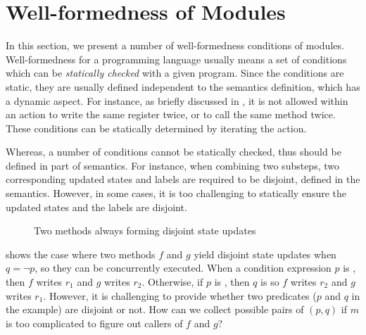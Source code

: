 \section{Well-formedness of Modules}
\label{sec-wf}

In this section, we present a number of well-formedness conditions of
modules. Well-formedness for a programming language usually means a
set of conditions which can be \emph{statically checked} with a given
program. Since the conditions are static, they are usually defined
independent to the semantics definition, which has a dynamic aspect.
For instance, as briefly discussed in , it is not
allowed within an action to write the same register twice, or to call
the same method twice. These conditions can be statically determined
by iterating the action.

Whereas, a number of conditions cannot be statically checked, thus
should be defined in part of semantics. For instance, when combining
two substeps, two corresponding updated states and labels are required
to be disjoint, defined in the \Substeps{} semantics. However, in some
cases, it is too challenging to statically ensure the updated states
and the labels are disjoint.

\begin{figure}[h]
  \caption{Two methods always forming disjoint state updates}
  \label{ex-two-methods-disjoint}
\end{figure}

 shows the case where two methods $f$
and $g$ yield disjoint state updates when $q = \neg p$, so they can be
concurrently executed. When a condition expression $p$ is \btrue{},
then $f$ writes $r_1$ and $g$ writes $r_2$. Otherwise, if $p$ is
\bfalse{}, then $q$ is \btrue{} so $f$ writes $r_2$ and $g$ writes
$r_1$. However, it is challenging to provide whether two predicates
($p$ and $q$ in the example) are disjoint or not. How can we collect
possible pairs of $(p, q)$ if $m$ is too complicated to figure out
callers of $f$ and $g$?

